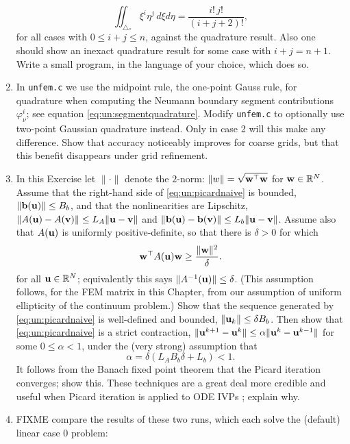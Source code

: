 \begin{enumerate}
\begin{equation}
\iint_{\triangle_\ast} \xi^i \eta^j\,d\xi d\eta = \frac{i!\,j!}{(i+j+2)!}, \label{eq:un:checkquadrature}
\end{equation}
for all cases with $0\le i+j\le n$, against the quadrature result.  Also one should show an inexact quadrature result for some case with $i+j=n+1$.  Write a small program, in the language of your choice, which does so.
\item \label{exer:un:gaussneumann}  In \texttt{unfem.c} we use the midpoint rule, the one-point Gauss rule, for quadrature when computing the Neumann boundary segment contributions $\varphi_\nu^i$; see equation \eqref{eq:un:segmentquadrature}.  Modify \texttt{unfem.c} to optionally use two-point Gaussian quadrature instead.  Only in case 2 will this make any difference.  Show that accuracy noticeably improves for coarse grids, but that this benefit disappears under grid refinement.
\item \label{exer:un:picardconvergence}  In this Exercise let $\|\cdot\|$ denote the $2$-norm: $\|w\| = \sqrt{\mathbf{w}^\top \mathbf{w}}$ for $\mathbf{w}\in\mathbb{R}^N$.  Assume that the right-hand side of \eqref{eq:un:picardnaive} is bounded, $\|\mathbf{b}(\mathbf{u})\| \le B_b$, and that the nonlinearities are Lipschitz, $\|A(\mathbf{u})-A(\mathbf{v})\| \le L_A \|\mathbf{u}-\mathbf{v}\|$ and $\|\mathbf{b}(\mathbf{u})-\mathbf{b}(\mathbf{v})\| \le L_b \|\mathbf{u}-\mathbf{v}\|$.  Assume also that $A(\mathbf{u})$ is uniformly positive-definite, so that there is $\delta>0$ for which
    $$\mathbf{w}^\top A(\mathbf{u}) \mathbf{w} \ge \frac{\|\mathbf{w}\|^2}{\delta}.$$
for all $\mathbf{u}\in \mathbb{R}^N$; equivalently this says $\|A^{-1}(\mathbf{u})\| \le \delta$.  (This assumption follows, for the FEM matrix in this Chapter, from our assumption of uniform ellipticity of the continuum problem.)  Show that the sequence generated by \eqref{eq:un:picardnaive} is well-defined and bounded, $\|\mathbf{u}_k\| \le \delta B_b$.  Then show that \eqref{eq:un:picardnaive} is a strict contraction, $\|\mathbf{u}^{k+1}-\mathbf{u}^{k}\| \le \alpha \|\mathbf{u}^{k}-\mathbf{u}^{k-1}\|$ for some $0\le \alpha < 1$, under the (very strong) assumption that
    $$\alpha = \delta \left(L_A B_b \delta + L_b\right) < 1.$$
It follows from the Banach fixed point theorem that the Picard iteration converges; show this.  These techniques are a great deal more credible and useful when Picard iteration is applied to ODE IVPs \citep{HirschSmaleDevaney2004}; explain why.
\item FIXME compare the results of these two runs, which each solve the (default) linear case 0 problem:
\end{enumerate}
